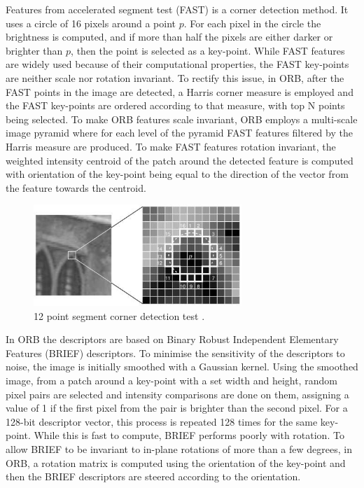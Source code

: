 \documentclass{l4proj}
\begin{document}
Features from accelerated segment test (FAST) is a corner detection method. It uses a circle of 16 pixels around a point $p$. For each pixel in the circle the brightness is computed, and if more than half the pixels are either darker or brighter than $p$, then the point is selected as a key-point. While FAST features are widely used because of their computational properties, the FAST key-points are neither scale nor rotation invariant. To rectify this issue, in ORB, after the FAST points in the image are detected, a Harris corner measure is employed and the FAST key-points are ordered according to that measure, with top N points being selected. To make ORB features scale invariant, ORB employs a multi-scale image pyramid where for each level of the pyramid FAST features filtered by the Harris measure are produced. To make FAST features rotation invariant, the weighted intensity centroid of the patch around the detected feature is computed with orientation of the key-point being equal to the direction of the vector from the feature towards the centroid. 

\begin{figure}[ht]
    \centering
    \includegraphics[width=0.7\textwidth]{l4template-master/images/FAST.jpg}
    \caption{12 point segment corner detection test \citep{fast}.}
    \label{fast}
\end{figure}

In ORB the descriptors are based on Binary Robust Independent Elementary Features (BRIEF) descriptors. To minimise the sensitivity of the descriptors to noise, the image is initially smoothed with a Gaussian kernel. Using the smoothed image, from a patch around a key-point with a set width and height, random pixel pairs are selected and intensity comparisons are done on them, assigning a value of 1 if the first pixel from the pair is brighter than the second pixel. For a 128-bit descriptor vector, this process is repeated 128 times for the same key-point. While this is fast to compute, BRIEF performs poorly with rotation. To allow BRIEF to be invariant to in-plane rotations of more than a few degrees, in ORB, a rotation matrix is computed using the orientation of the key-point and then the BRIEF descriptors are steered according to the orientation.
\end{document}

